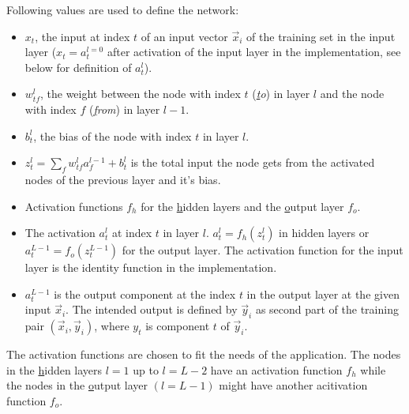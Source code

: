 Following values are used to define the network:
\begin{itemize}
    \item $x_t$, the input at index $t$ of an input vector $\vec{x}_i$ of the training set
    in the input layer ($x_t = a^{l=0}_t$ after activation of the input layer in the
    implementation, see below for definition of $a^l_t$).

    \item $w^l_{tf}$, the weight between the node with index $t$ (\emph{\underline{t}o})
    in layer $l$ and the node with index $f$ (\emph{\underline{f}rom}) in layer $l-1$.

    \item $b^l_t$, the bias of the node with index $t$ in layer $l$.
    
    \item $z^l_t = \sum_{f}{w^l_{tf} a^{l-1}_f} + b^l_t$ is the total input the node gets
    from the activated nodes of the previous layer and it's bias.
    
    \item Activation functions $f_h$ for the \underline{h}idden layers and the
    \underline{o}utput layer $f_o$.
    
    \item The activation $a^l_t$ at index $t$ in layer $l$. $a^l_t = f_h(z^l_t)$ in hidden
    layers or $a^{L-1}_t = f_o(z^{L-1}_t)$ for the output layer. The activation function
    for the input layer is the identity function in the implementation.

    \item $a^{L-1}_t$ is the output component at the index $t$ in the output layer at the
    given input $\vec{x}_i$. The intended output is defined by $\vec{y}_i$ as second part
    of the training pair $(\vec{x}_i, \vec{y}_i)$, where $y_t$ is component $t$ of
    $\vec{y}_i$.
\end{itemize}

The activation functions are chosen to fit the needs of the application. The nodes in the
\underline{h}idden layers $l=1$ up to $l=L-2$ have an activation function $f_h$ while the
nodes in the \underline{o}utput layer $(l=L-1)$ might have another acitivation function
$f_o$. \\

